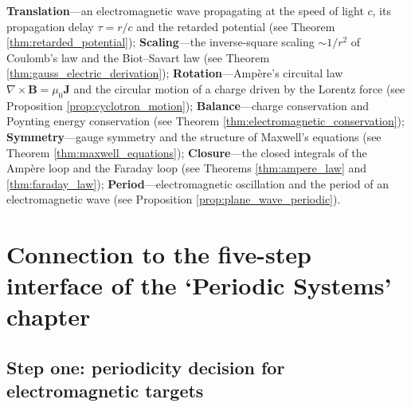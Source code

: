 \begin{remark}\label{rem:em_seven_themes}
\textbf{Translation}---an electromagnetic wave propagating at the speed of light $c$, its propagation delay $\tau = r/c$ and the retarded potential (see Theorem \ref{thm:retarded_potential}); \textbf{Scaling}---the inverse-square scaling $\sim 1/r^2$ of Coulomb's law and the Biot--Savart law (see Theorem \ref{thm:gauss_electric_derivation}); \textbf{Rotation}---Amp\`ere's circuital law $\nabla\times\mathbf{B}=\mu_0\mathbf{J}$ and the circular motion of a charge driven by the Lorentz force (see Proposition \ref{prop:cyclotron_motion}); \textbf{Balance}---charge conservation and Poynting energy conservation (see Theorem \ref{thm:electromagnetic_conservation}); \textbf{Symmetry}---gauge symmetry and the structure of Maxwell's equations (see Theorem \ref{thm:maxwell_equations}); \textbf{Closure}---the closed integrals of the Amp\`ere loop and the Faraday loop (see Theorems \ref{thm:ampere_law} and \ref{thm:faraday_law}); \textbf{Period}---electromagnetic oscillation and the period of an electromagnetic wave (see Proposition \ref{prop:plane_wave_periodic}).
\end{remark}

\section{Connection to the five-step interface of the `Periodic Systems' chapter}
\label{sec:em_five_steps}

\subsection{Step one: periodicity decision for electromagnetic targets}

